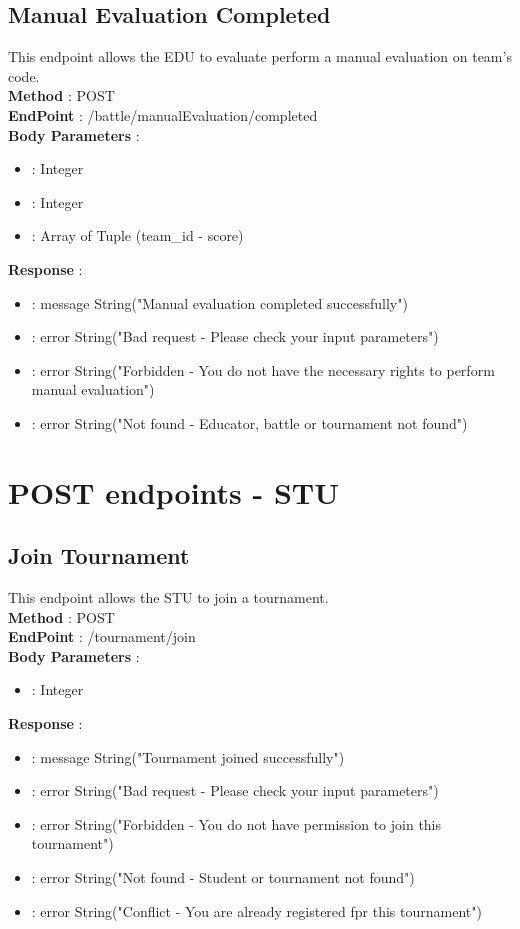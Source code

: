 \subsection*{Manual Evaluation Completed}
This endpoint allows the EDU to evaluate perform a manual evaluation on team's code.\\
\textbf{Method} : POST \\
\textbf{EndPoint} : /battle/manualEvaluation/completed \\
\textbf{Body Parameters} :
\begin{itemize}
    \item {} : Integer
    \item {} : Integer
    \item {} : Array of Tuple (team\_id - score)   
\end{itemize}
\textbf{Response} :
\begin{itemize}
    \item {} : message String("Manual evaluation completed successfully")
    \item {} : error String("Bad request - Please check your input parameters")
    \item {} : error String("Forbidden - You do not have the necessary rights to perform manual evaluation")
    \item {} : error String("Not found - Educator, battle or tournament not found")
\end{itemize}

\section*{POST endpoints - STU}
\subsection*{Join Tournament}
This endpoint allows the STU to join a tournament.\\
\textbf{Method} : POST \\
\textbf{EndPoint} : /tournament/join \\
\textbf{Body Parameters} :
\begin{itemize}
    \item {} : Integer   
\end{itemize}
\textbf{Response} :
\begin{itemize}
    \item {} : message String("Tournament joined successfully")
    \item {} : error String("Bad request - Please check your input parameters")
    \item {} : error String("Forbidden - You do not have permission to join this tournament")
    \item {} : error String("Not found - Student or tournament not found")
    \item {} : error String("Conflict - You are already registered fpr this tournament")
\end{itemize}

